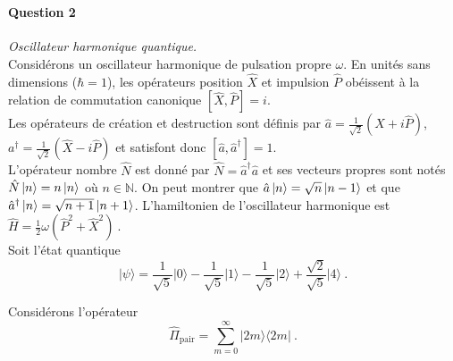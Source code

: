 \begin{enumerate}
\end{enumerate}

\newpage
\ 
\newpage
 

\paragraph{Question 2} \textit{Oscillateur harmonique quantique.} \\

Considérons un oscillateur harmonique de pulsation propre $\omega$. En unités sans dimensions ($\hbar=1$), les opérateurs position $\hat X$ et impulsion $\hat P$ obéissent à la relation de commutation canonique $[\hat X, \hat P]=i $. \\

Les opérateurs de création et destruction sont définis par 
$\hat a= \frac{1}{\sqrt{2}}(\hat X+i\hat P)$, $a^\dagger= \frac{1}{\sqrt{2}}(\hat X-i\hat P)$ et satisfont donc $[\hat a,\hat a^\dagger]=1$. \\

L'opérateur nombre $\hat N$ est donné par $\hat N= \hat a^\dagger \hat a$ et ses vecteurs propres sont notés $\hat N \ket{n} =n \ket{n}$ où $n \in \mathbb{N}$. On peut montrer que $\hat a \ket{n} =\sqrt{n} \ket{n-1}$ et que $\hat a^\dagger \ket{n} =\sqrt{n+1} \ket{n+1}$. L'hamiltonien de l'oscillateur harmonique est $\hat H = \frac{1}{2}\omega ( \hat P^2 + \hat X^2 )\ $. \\

Soit l'état quantique 
\begin{equation}
\vert \psi \rangle = 
 \frac{1}{\sqrt{5}}\vert 0\rangle -  \frac{1}{\sqrt{5}}\vert 1\rangle  - \frac{1}{\sqrt{5}}\vert 2\rangle + \frac{\sqrt{2}}{\sqrt{5}}\vert 4\rangle \ .
 \label{Eq:psi}
\end{equation}

Considérons l'opérateur
\begin{equation}
\hat \Pi_{\text{pair}}=\sum_{m=0}^\infty \vert 2m \rangle \langle 2m \vert \ .
\end{equation}


